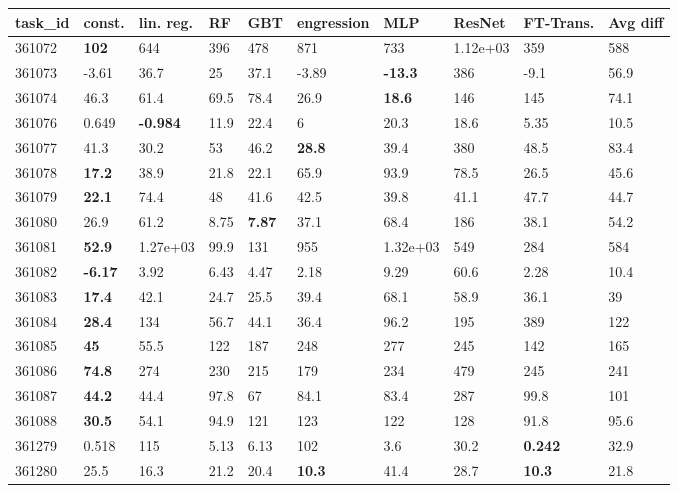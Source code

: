 \begin{table}[ht!]
\centering
\begingroup\footnotesize
\begin{tabular}{llllllllll}
  \hline
\hline
task\_id & const. & lin. reg. & RF & GBT & engression & MLP & ResNet & FT-Trans. & Avg diff \\ 
  \hline
361072 & \textbf{102} & 644 & 396 & 478 & 871 & 733 & 1.12e+03 & 359 & 588 \\ 
  361073 & -3.61 & 36.7 & 25 & 37.1 & -3.89 & \textbf{-13.3} & 386 & -9.1 & 56.9 \\ 
  361074 & 46.3 & 61.4 & 69.5 & 78.4 & 26.9 & \textbf{18.6} & 146 & 145 & 74.1 \\ 
  361076 & 0.649 & \textbf{-0.984} & 11.9 & 22.4 & 6 & 20.3 & 18.6 & 5.35 & 10.5 \\ 
  361077 & 41.3 & 30.2 & 53 & 46.2 & \textbf{28.8} & 39.4 & 380 & 48.5 & 83.4 \\ 
  361078 & \textbf{17.2} & 38.9 & 21.8 & 22.1 & 65.9 & 93.9 & 78.5 & 26.5 & 45.6 \\ 
  361079 & \textbf{22.1} & 74.4 & 48 & 41.6 & 42.5 & 39.8 & 41.1 & 47.7 & 44.7 \\ 
  361080 & 26.9 & 61.2 & 8.75 & \textbf{7.87} & 37.1 & 68.4 & 186 & 38.1 & 54.2 \\ 
  361081 & \textbf{52.9} & 1.27e+03 & 99.9 & 131 & 955 & 1.32e+03 & 549 & 284 & 584 \\ 
  361082 & \textbf{-6.17} & 3.92 & 6.43 & 4.47 & 2.18 & 9.29 & 60.6 & 2.28 & 10.4 \\ 
  361083 & \textbf{17.4} & 42.1 & 24.7 & 25.5 & 39.4 & 68.1 & 58.9 & 36.1 & 39 \\ 
  361084 & \textbf{28.4} & 134 & 56.7 & 44.1 & 36.4 & 96.2 & 195 & 389 & 122 \\ 
  361085 & \textbf{45} & 55.5 & 122 & 187 & 248 & 277 & 245 & 142 & 165 \\ 
  361086 & \textbf{74.8} & 274 & 230 & 215 & 179 & 234 & 479 & 245 & 241 \\ 
  361087 & \textbf{44.2} & 44.4 & 97.8 & 67 & 84.1 & 83.4 & 287 & 99.8 & 101 \\ 
  361088 & \textbf{30.5} & 54.1 & 94.9 & 121 & 123 & 122 & 128 & 91.8 & 95.6 \\ 
  361279 & 0.518 & 115 & 5.13 & 6.13 & 102 & 3.6 & 30.2 & \textbf{0.242} & 32.9 \\ 
  361280 & 25.5 & 16.3 & 21.2 & 20.4 & \textbf{10.3} & 41.4 & 28.7 & \textbf{10.3} & 21.8 \\ 

\end{tabular}
\end{table}
